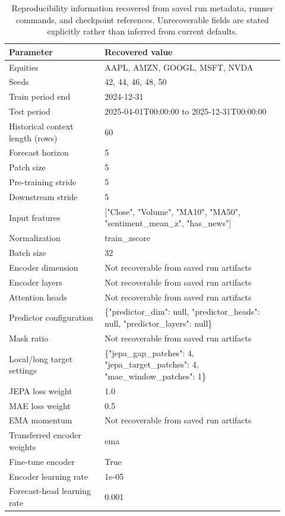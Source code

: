 \begin{table}[p]
\centering
\small
\caption{Reproducibility information recovered from saved run metadata, runner commands, and checkpoint references. Unrecoverable fields are stated explicitly rather than inferred from current defaults.}
\label{tab:reproducibility}
\begin{tabular}{p{0.32\linewidth}p{0.60\linewidth}}
\toprule
Parameter & Recovered value \\
\midrule
Equities & AAPL, AMZN, GOOGL, MSFT, NVDA \\
Seeds & 42, 44, 46, 48, 50 \\
Train period end & 2024-12-31 \\
Test period & 2025-04-01T00:00:00 to 2025-12-31T00:00:00 \\
Historical context length (rows) & 60 \\
Forecast horizon & 5 \\
Patch size & 5 \\
Pre-training stride & 5 \\
Downstream stride & 5 \\
Input features & ["Close", "Volume", "MA10", "MA50", "sentiment\_mean\_z", "has\_news"] \\
Normalization & train\_zscore \\
Batch size & 32 \\
Encoder dimension & Not recoverable from saved run artifacts \\
Encoder layers & Not recoverable from saved run artifacts \\
Attention heads & Not recoverable from saved run artifacts \\
Predictor configuration & \{"predictor\_dim": null, "predictor\_heads": null, "predictor\_layers": null\} \\
Mask ratio & Not recoverable from saved run artifacts \\
Local/long target settings & \{"jepa\_gap\_patches": 4, "jepa\_target\_patches": 4, "mae\_window\_patches": 1\} \\
JEPA loss weight & 1.0 \\
MAE loss weight & 0.5 \\
EMA momentum & Not recoverable from saved run artifacts \\
Transferred encoder weights & ema \\
Fine-tune encoder & True \\
Encoder learning rate & 1e-05 \\
Forecast-head learning rate & 0.001 \\

\end{tabular}
\end{table}
